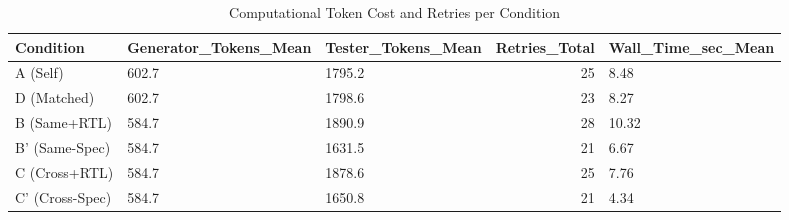 \begin{table}
\caption{Computational Token Cost and Retries per Condition}
\label{tab:cost_tokens}
\begin{tabular}{lllrl}
\toprule
Condition & Generator_Tokens_Mean & Tester_Tokens_Mean & Retries_Total & Wall_Time_sec_Mean \\
\midrule
A (Self) & 602.7 & 1795.2 & 25 & 8.48 \\
D (Matched) & 602.7 & 1798.6 & 23 & 8.27 \\
B (Same+RTL) & 584.7 & 1890.9 & 28 & 10.32 \\
B' (Same-Spec) & 584.7 & 1631.5 & 21 & 6.67 \\
C (Cross+RTL) & 584.7 & 1878.6 & 25 & 7.76 \\
C' (Cross-Spec) & 584.7 & 1650.8 & 21 & 4.34 \\
\bottomrule
\end{tabular}
\end{table}
